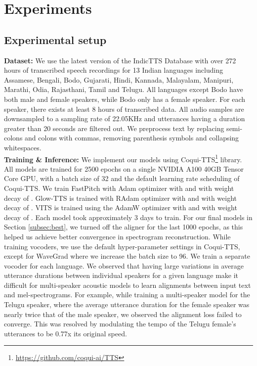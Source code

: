 \documentclass{article}
\begin{document}
\section{Experiments}

\subsection{Experimental setup}

\textbf{Dataset:} We use the latest version of the IndicTTS Database \cite{baby2016resources} with over 272 hours of transcribed speech recordings for 13 Indian languages including Assamese, Bengali, Bodo, Gujarati, Hindi, Kannada, Malayalam, Manipuri, Marathi, Odia, Rajasthani, Tamil and Telugu. All languages except Bodo have both male and female speakers, while Bodo only has a female speaker. For each speaker, there exists at least 8 hours of transcribed data. All audio samples are downsampled to a sampling rate of 22.05KHz and utterances having a duration greater than 20 seconds are filtered out. We preprocess text by replacing semi-colons and colons with commas, removing parenthesis symbols and collapsing whitespaces.
\\
\textbf{Training \& Inference:} We implement our models using Coqui-TTS\footnote{\scriptsize \url{https://github.com/coqui-ai/TTS}} library. All models are trained for 2500 epochs on a single NVIDIA A100 40GB Tensor Core GPU, with a batch size of 32 and the default learning rate scheduling of Coqui-TTS. We train FastPitch with Adam optimizer with  and  with weight decay of . Glow-TTS is trained with RAdam optimizer with  and  with weight decay of . VITS is trained using the AdamW optimizer with  and  with weight decay of . Each model took approximately 3 days to train. For our final models in Section \ref{subsec:best}, we turned off the aligner for the last 1000 epochs, as this helped us achieve better convergence in spectrogram reconstruction. While training vocoders, we use the default hyper-parameter settings in Coqui-TTS, except for WaveGrad where we increase the batch size to 96. We train a separate vocoder for each language. We observed that having large variations in average utterance durations between individual speakers for a given language make it difficult for multi-speaker acoustic models to learn alignments between input text and mel-spectrograms. 
For example, while training a multi-speaker model for the Telugu speaker, where the average utterance duration for the female speaker was nearly twice that of the male speaker, we observed the alignment loss failed to converge. This was resolved by modulating the tempo of the Telugu female's utterances to be 0.77x its original speed. 
\end{document}

